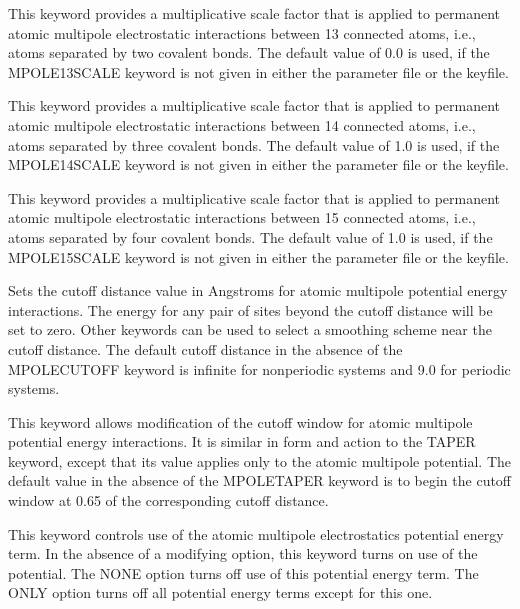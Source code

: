 \documentclass[letterpaper,11pt,english]{sphinxmanual}
\begin{document}
  This keyword provides a multiplicative scale factor that is applied to permanent atomic multipole  electrostatic interactions between 1\sphinxhyphen{}3 connected atoms, i.e., atoms separated by two covalent bonds. The default value of 0.0 is used, if the MPOLE\sphinxhyphen{}13\sphinxhyphen{}SCALE keyword is not given in either the parameter file or the keyfile.

  This keyword provides a multiplicative scale factor that is applied to permanent atomic multipole  electrostatic interactions between 1\sphinxhyphen{}4 connected atoms, i.e., atoms separated by three covalent bonds. The default value of 1.0 is used, if the MPOLE\sphinxhyphen{}14\sphinxhyphen{}SCALE keyword is not given in either the parameter file or the keyfile.

  This keyword provides a multiplicative scale factor that is applied to permanent atomic multipole  electrostatic interactions between 1\sphinxhyphen{}5 connected atoms, i.e., atoms separated by four covalent bonds. The default value of 1.0 is used, if the MPOLE\sphinxhyphen{}15\sphinxhyphen{}SCALE keyword is not given in either the parameter file or the keyfile.

  Sets the cutoff distance value in Angstroms for atomic multipole potential energy interactions. The energy for any pair of sites beyond the cutoff distance will be set to zero. Other keywords can be used to select a smoothing scheme near the cutoff distance. The default cutoff distance in the absence of the MPOLE\sphinxhyphen{}CUTOFF keyword is infinite for nonperiodic systems and 9.0 for periodic systems.

  This keyword allows modification of the cutoff window for atomic multipole potential energy interactions. It is similar in form and action to the TAPER keyword, except that its value applies only to the atomic multipole potential. The default value in the absence of the MPOLE\sphinxhyphen{}TAPER keyword is to begin the cutoff window at 0.65 of the corresponding cutoff distance.

  This keyword controls use of the atomic multipole electrostatics potential energy term. In the absence of a modifying option, this keyword turns on use of the potential. The NONE option turns off use of this potential energy term. The ONLY option turns off all potential energy terms except for this one.
\end{document}
